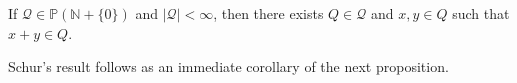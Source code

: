 If $\mathcal{Q} \in \mathbb{P}(\mathbb{N} + \{0\})$ and $|\mathcal{Q}| < \infty$, then there exists $Q \in \mathcal{Q}$ and $x, y \in Q$ such that $x + y \in Q$.

Schur’s result follows as an immediate corollary of the next proposition.
